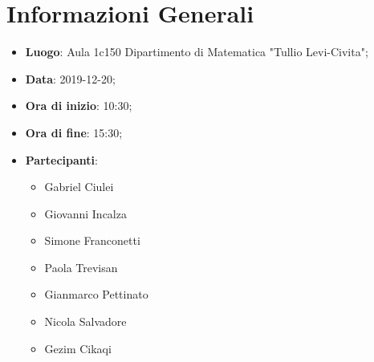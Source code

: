 \section{Informazioni Generali}
	\begin{itemize}
		\item \textbf {Luogo}: Aula 1c150 Dipartimento di Matematica "Tullio Levi-Civita";
		\item \textbf {Data}: 2019-12-20;
		\item \textbf {Ora di inizio}: 10:30;
		\item \textbf {Ora di fine}: 15:30;
		\item \textbf {Partecipanti}:
			\begin{itemize}
				\item Gabriel Ciulei
				\item Giovanni Incalza
				\item Simone Franconetti
				\item Paola Trevisan
				\item Gianmarco Pettinato
				\item Nicola Salvadore
				\item Gezim Cikaqi
			\end{itemize}
	\end{itemize}

